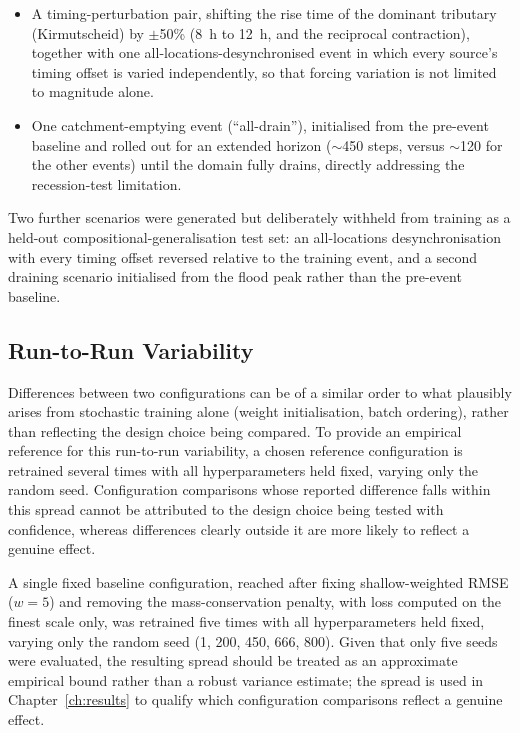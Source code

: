 \documentclass[12pt,a4paper]{report}
\begin{document}
{\begin{itemize}
    \item A timing-perturbation pair, shifting the rise time of the dominant tributary (Kirmutscheid) by $\pm$50\% (8~h to 12~h, and the reciprocal contraction), together with one all-locations-desynchronised event in which every source's timing offset is varied independently, so that forcing variation is not limited to magnitude alone.
    
    \item One catchment-emptying event (``all-drain''), initialised from the pre-event baseline and rolled out for an extended horizon ($\sim$450 steps, versus $\sim$120 for the other events) until the domain fully drains, directly addressing the recession-test limitation.
\end{itemize}

Two further scenarios were generated but deliberately withheld from training as a held-out compositional-generalisation test set: an all-locations desynchronisation with every timing offset reversed relative to the training event, and a second draining scenario initialised from the flood peak rather than the pre-event baseline.

\subsection{Run-to-Run Variability}
\label{subsec:seed_ruler_ahr}

Differences between two configurations can be of a similar order to what plausibly
arises from stochastic training alone (weight initialisation, batch ordering), rather
than reflecting the design choice being compared. To provide an empirical reference
for this run-to-run variability, a chosen reference configuration is retrained several
times with all hyperparameters held fixed, varying only the random seed. Configuration comparisons whose reported difference
falls within this spread cannot be attributed to the design choice being tested with
confidence, whereas differences clearly outside it are more likely to reflect a
genuine effect.

A single fixed baseline configuration, reached after fixing shallow-weighted RMSE
($w=5$) and removing the mass-conservation penalty, with loss computed on the finest
scale only, was retrained five times with all hyperparameters held fixed, varying
only the random seed (1, 200, 450, 666, 800). Given that only five seeds were
evaluated, the resulting spread should be treated as an approximate empirical bound
rather than a robust variance estimate; the spread is used in
Chapter~\ref{ch:results} to qualify which configuration comparisons reflect a
genuine effect.

}
\end{document}

